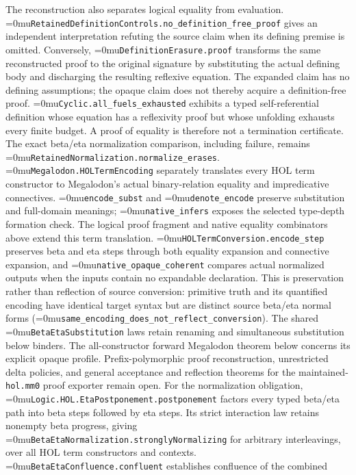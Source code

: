 \documentclass[11pt]{article}
\newcommand{\leanname}[1]{\textup{\Urlmuskip=0mu\relax\nolinkurl{#1}}}
\theoremstyle{definition}
\theoremstyle{remark}
\newcommand{\code}[1]{\texttt{#1}}
\begin{document}
The reconstruction also separates logical equality from evaluation.
\leanname{RetainedDefinitionControls.no_definition_free_proof} gives an
independent interpretation refuting the source claim when its defining
premise is omitted. Conversely, \leanname{DefinitionErasure.proof} transforms
the same reconstructed proof to the original signature by substituting the
actual defining body and discharging the resulting reflexive equation. The
expanded claim has no defining assumptions; the opaque claim does not thereby
acquire a definition-free proof. \leanname{Cyclic.all_fuels_exhausted} exhibits a typed
self-referential definition whose equation has a reflexivity proof but whose
unfolding exhausts every finite budget. A proof of equality is therefore not
a termination certificate. The exact beta/eta normalization comparison,
including failure, remains \leanname{RetainedNormalization.normalize_erases}.
\leanname{Megalodon.HOLTermEncoding} separately translates every HOL term
constructor to Megalodon's actual binary-relation equality and impredicative
connectives. \leanname{encode_subst} and \leanname{denote_encode} preserve
substitution and full-domain meanings; \leanname{native_infers} exposes the
selected type-depth formation check. The logical proof fragment and native
equality combinators above extend this term translation.
\leanname{HOLTermConversion.encode_step} preserves beta and eta steps
through both equality expansion and connective expansion, and
\leanname{native_opaque_coherent} compares actual normalized outputs when
the inputs contain no expandable declaration. This is preservation rather
than reflection of source conversion: primitive truth and its quantified
encoding have identical target syntax but are distinct source beta/eta
normal forms (\leanname{same_encoding_does_not_reflect_conversion}).
The shared \leanname{BetaEtaSubstitution} laws retain renaming and
simultaneous substitution below binders.
The all-constructor forward Megalodon theorem below concerns its explicit
opaque profile. Prefix-polymorphic proof reconstruction, unrestricted delta
policies, and general acceptance and reflection theorems for the
maintained-\code{hol.mm0} proof exporter remain open.
For the normalization obligation,
\leanname{Logic.HOL.EtaPostponement.postponement} factors every typed
beta/eta path into beta steps followed by eta steps. Its strict interaction
law retains nonempty beta progress, giving
\leanname{BetaEtaNormalization.stronglyNormalizing} for arbitrary
interleavings, over all HOL term constructors and contexts.
\leanname{BetaEtaConfluence.confluent} establishes confluence of the combined
\end{document}
